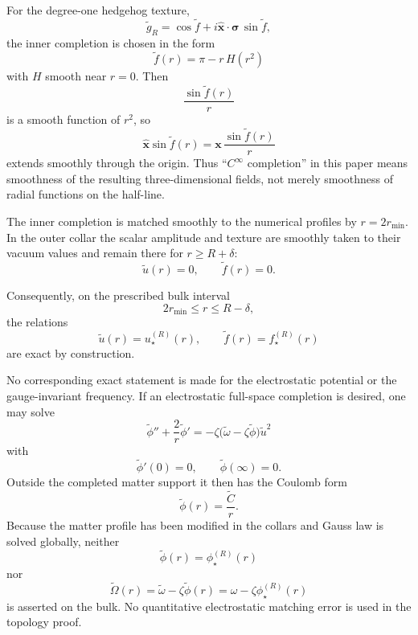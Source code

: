 \documentclass[11pt]{article}
\begin{document}
For the degree-one hedgehog texture,
\begin{equation}
\widetilde g_R
=
\cos\widetilde f
+
i\hat{\bm x}\cdot\bm\sigma\,
\sin\widetilde f,
\end{equation}
the inner completion is chosen in the form
\begin{equation}
\boxed{
\widetilde f(r)
=
\pi-r\,H(r^2)
}
\end{equation}
with \(H\) smooth near \(r=0\). Then
\begin{equation}
\frac{\sin\widetilde f(r)}{r}
\end{equation}
is a smooth function of \(r^2\), so
\begin{equation}
\hat{\bm x}\sin\widetilde f(r)
=
\bm x\,
\frac{\sin\widetilde f(r)}{r}
\end{equation}
extends smoothly through the origin. Thus ``\(C^\infty\) completion'' in this paper means smoothness of the resulting three-dimensional fields, not merely smoothness of radial functions on the half-line.

The inner completion is matched smoothly to the numerical profiles by \(r=2r_{\min}\). In the outer collar the scalar amplitude and texture are smoothly taken to their vacuum values and remain there for \(r\ge R+\delta\):
\begin{equation}
\widetilde u(r)=0,
\qquad
\widetilde f(r)=0.
\end{equation}

Consequently, on the prescribed bulk interval
\begin{equation}
\boxed{
2r_{\min}\le r\le R-\delta,
}
\end{equation}
the relations
\begin{equation}
\boxed{
\widetilde u(r)=u_\star^{(R)}(r),
\qquad
\widetilde f(r)=f_\star^{(R)}(r)
}
\end{equation}
are exact by construction.

No corresponding exact statement is made for the electrostatic potential or the gauge-invariant frequency. If an electrostatic full-space completion is desired, one may solve
\begin{equation}
\widetilde\phi''
+
\frac2r\widetilde\phi'
=
-\zeta
\bigl(
\widetilde\omega-\zeta\widetilde\phi
\bigr)
\widetilde u^2
\end{equation}
with
\begin{equation}
\widetilde\phi'(0)=0,
\qquad
\widetilde\phi(\infty)=0.
\end{equation}
Outside the completed matter support it then has the Coulomb form
\begin{equation}
\widetilde\phi(r)=\frac{\widetilde C}{r}.
\end{equation}
Because the matter profile has been modified in the collars and Gauss law is solved globally, neither
\begin{equation}
\widetilde\phi(r)=\phi_\star^{(R)}(r)
\end{equation}
nor
\begin{equation}
\widetilde\Omega(r)
=
\widetilde\omega-\zeta\widetilde\phi(r)
=
\omega-\zeta\phi_\star^{(R)}(r)
\end{equation}
is asserted on the bulk. No quantitative electrostatic matching error is used in the topology proof.
\end{document}

